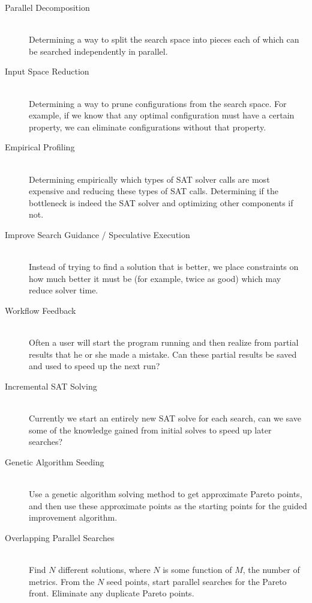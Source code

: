 \documentclass[11pt]{article}
\begin{document}
\begin{description}
  \item[Parallel Decomposition] \hfill \\
      Determining a way to split the search space into pieces each of
      which can be searched independently in parallel.
  \item[Input Space Reduction] \hfill \\
      Determining a way to prune configurations from the search
      space. For example, if we know that any optimal configuration
      must have a certain property, we can eliminate configurations
      without that property.
  \item[Empirical Profiling] \hfill \\
      Determining empirically which types of SAT solver calls are most
      expensive and reducing these types of SAT calls. Determining if
      the bottleneck is indeed the SAT solver and optimizing other
      components if not.
  \item[Improve Search Guidance / Speculative Execution] \hfill \\
      Instead of trying to find a solution that is better, we place
      constraints on how much better it must be (for example, twice as
      good) which may reduce solver time.
  \item[Workflow Feedback] \hfill \\
      Often a user will start the program running and then realize
      from partial results that he or she made a mistake. Can these
      partial results be saved and used to speed up the next run?
  \item[Incremental SAT Solving] \hfill \\
      Currently we start an entirely new SAT solve for each search,
      can we save some of the knowledge gained from initial solves to
      speed up later searches?
  \item[Genetic Algorithm Seeding] \hfill \\
      Use a genetic algorithm solving method to get approximate Pareto
      points, and then use these approximate points as the starting
      points for the guided improvement algorithm.
  \item[Overlapping Parallel Searches] \hfill \\
      Find $N$ different solutions, where $N$ is some function of $M$,
      the number of metrics. From the $N$ seed points, start parallel
      searches for the Pareto front. Eliminate any duplicate Pareto
      points.
\end{description}
\end{document}
